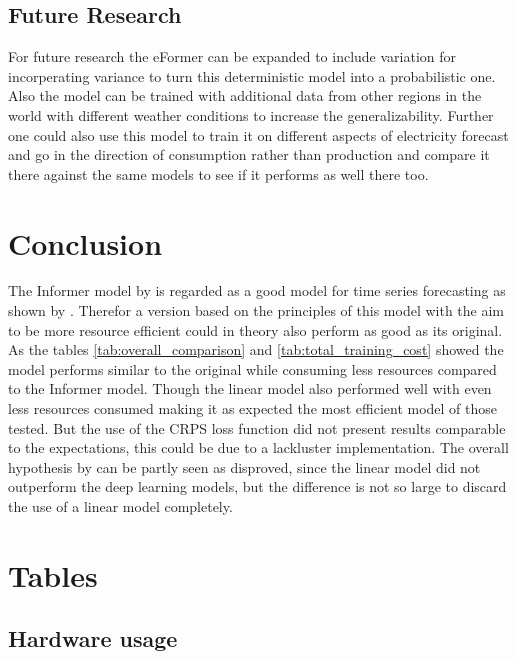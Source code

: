 \documentclass{article}
\begin{document}
\subsection{Future Research}

For future research the eFormer can be expanded to include variation for incorperating variance to turn this deterministic model into a probabilistic one. Also the model can be trained with additional data from other regions in the world with different weather conditions to increase the generalizability. Further one could also use this model to train it on different aspects of electricity forecast and go in the direction of consumption rather than production and compare it there against the same models to see if it performs as well there too.


\section{Conclusion}

The Informer model by \cite{Informer} is regarded as a good model for time series forecasting as shown by \cite{TS-ranking}. Therefor a version based on the principles of this model with the aim to be more resource efficient could in theory also perform as good as its original. As the tables \ref{tab:overall_comparison} and \ref{tab:total_training_cost} showed the model performs similar to the original while consuming less resources compared to the Informer model. Though the linear model also performed well with even less resources consumed making it as expected the most efficient model of those tested. But the use of the CRPS loss function did not present results comparable to the expectations, this could be due to a lackluster implementation. The overall hypothesis by \cite{transformers-effectiveness} can be partly seen as disproved, since the linear model did not outperform the deep learning models, but the difference is not so large to discard the use of a linear model completely.

\newpage

\printbibliography

\newpage

\appendix

\section{Tables}

\subsection{Hardware usage}
\end{document}
